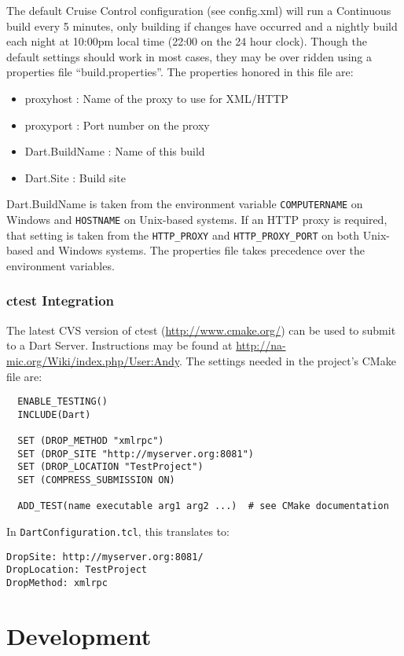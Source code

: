 \documentclass{InsightBook}
\newcommand{\filename}[1]{\texttt{#1}}
\begin{document}
The default Cruise Control configuration (see config.xml) will run a
Continuous build every 5 minutes, only building if changes have
occurred and a nightly build each night at 10:00pm local time (22:00 on
the 24 hour clock).  Though the default settings should work in most
cases, they may be over ridden using a properties file
``build.properties''.  The properties honored in this file are:

\begin{itemize}
  \item proxyhost : Name of the proxy to use for XML/HTTP
  \item proxyport : Port number on the proxy
  \item Dart.BuildName : Name of this build
  \item Dart.Site : Build site
\end{itemize}

Dart.BuildName is taken from the environment variable
\texttt{COMPUTERNAME} on Windows and \texttt{HOSTNAME} on Unix-based systems.  If an
HTTP proxy is required, that setting is taken from the
 \texttt{HTTP\_PROXY} and \texttt{HTTP\_PROXY\_PORT} on both Unix-based
and Windows systems.  The properties file takes precedence over the
environment variables.

\subsection{ctest Integration}
The latest CVS version of ctest (\url{http://www.cmake.org/}) can be used to submit to a Dart
Server.  Instructions may be found at
\url{http://na-mic.org/Wiki/index.php/User:Andy}.
The settings needed in the project's CMake file are:
\begin{verbatim}
  ENABLE_TESTING()
  INCLUDE(Dart)

  SET (DROP_METHOD "xmlrpc")
  SET (DROP_SITE "http://myserver.org:8081")
  SET (DROP_LOCATION "TestProject")
  SET (COMPRESS_SUBMISSION ON)

  ADD_TEST(name executable arg1 arg2 ...)  # see CMake documentation
\end{verbatim}

In \filename{DartConfiguration.tcl}, this translates to:
\begin{verbatim}
DropSite: http://myserver.org:8081/
DropLocation: TestProject
DropMethod: xmlrpc
\end{verbatim}

\chapter{Development}
\end{document}
